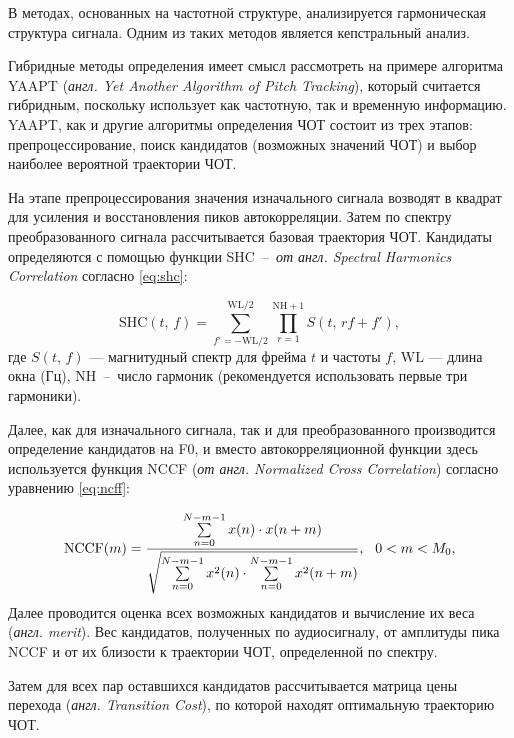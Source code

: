 В методах, основанных на частотной структуре, анализируется гармоническая структура сигнала. Одним из таких методов является кепстральный анализ. 

Гибридные методы определения  имеет смысл рассмотреть на примере алгоритма YAAPT (\textit{англ. Yet Another Algorithm of Pitch Tracking}), который считается гибридным, поскольку использует как частотную, так и временную информацию. YAAPT, как и другие алгоритмы определения ЧОТ состоит из трех этапов: препроцессирование, поиск кандидатов (возможных значений ЧОТ) и выбор наиболее вероятной траектории ЧОТ.

На этапе препроцессирования значения изначального сигнала возводят в квадрат для усиления и восстановления пиков автокорреляции. Затем по спектру преобразованного сигнала рассчитывается базовая траектория ЧОТ. Кандидаты определяются с помощью функции SHC~--~\textit{от англ. Spectral Harmonics Correlation} согласно \ref{eq:shc}:

\begin{equation}\label{eq:shc}
	\mathrm{SHC}(t,\,f) = \sum\limits_{f'=-\mathrm{WL}/2}^{\mathrm{WL}/2} \prod\limits_{r=1}^{\mathrm{NH}+1}S(t,\,rf+f'),
\end{equation}
где $S(t,\,f)$ — магнитудный спектр для фрейма $t$ и частоты $f$, $\mathrm{WL}$ — длина окна (Гц), $\mathrm{NH}$~--~число гармоник (рекомендуется \cite{yaapt} использовать первые три гармоники). 

Далее, как для изначального сигнала, так и для преобразованного производится определение кандидатов на F0, и вместо автокорреляционной функции здесь используется функция NCCF (\textit{от англ. Normalized Cross Correlation}) согласно уравнению \ref{eq:ncff}:

\begin{equation}\label{eq:ncff}
	\mathrm{NCCF}(m) = \frac{\sum\limits_{n=0}^{N-m-1} x(n)\cdot x(n+m)}{\sqrt{\sum\limits_{n=0}^{N-m-1} x^2(n) \cdot \sum\limits_{n=0}^{N-m-1} x^2(n+m)}}\text{,} \hspace{0.3cm} 0 < m < M_{0},
\end{equation}
Далее проводится оценка всех возможных кандидатов и вычисление их веса (\textit{англ. merit}). Вес кандидатов, полученных по аудиосигналу, от амплитуды пика NCCF и от их близости к траектории ЧОТ, определенной по спектру.

Затем для всех пар оставшихся кандидатов рассчитывается матрица цены перехода (\textit{англ. Transition Cost}), по которой находят оптимальную траекторию ЧОТ. 

